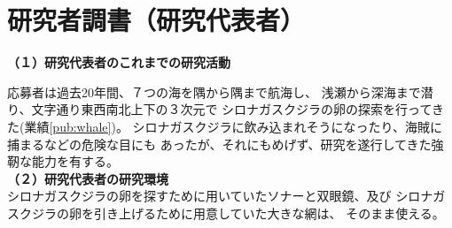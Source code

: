
\section{研究者調書（研究代表者）}

\renewcommand{\研究者氏名}{湯川秀樹}
\renewcommand{\研究者氏名ふりがな}{ゆかわ　ひでき}
\renewcommand{\研究者生年月日の年}{1900}
\renewcommand{\研究者生年月日の月}{2}
\renewcommand{\研究者生年月日の日}{29}
\renewcommand{\研究者年齢}{139}
\renewcommand{\研究者所属機関部局職}{\small{逢坂大学・原始殻研究所・名誉教授}}	%
\renewcommand{\研究者学位}{理学博士}


	\noindent
	\textbf{（１）研究代表者のこれまでの研究活動}\\
\PapersInstructions	%

	応募者は過去20年間、７つの海を隅から隅まで航海し、
	浅瀬から深海まで潜り、文字通り東西南北上下の３次元で
	シロナガスクジラの卵の探索を行ってきた(業績\ref{pub:whale})。
	シロナガスクジラに飲み込まれそうになったり、海賊に捕まるなどの危険な目にも
	あったが、それにもめげず、研究を遂行してきた強靭な能力を有する。
\\

	\noindent
	\textbf{（２）研究代表者の研究環境}\\
	シロナガスクジラの卵を探すために用いていたソナーと双眼鏡、及び
	シロナガスクジラの卵を引き上げるために用意していた大きな網は、
	そのまま使える。
\\

